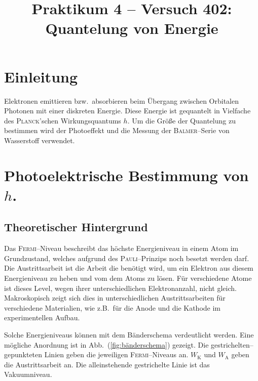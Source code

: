 \documentclass[sn-mathphys-num,iicol]{sn-jnl}
\theoremstyle{thmstyleone}
\theoremstyle{thmstyletwo}
\theoremstyle{thmstylethree}
\begin{document}
        
\title{Praktikum 4 -- Versuch 402: Quantelung von Energie}
\author*[1]{ }
\author*[1]{ }
\maketitle

\newpage
\section{Einleitung}
Elektronen emittieren bzw.\ absorbieren beim Übergang zwischen Orbitalen Photonen mit einer diskreten Energie.
Diese Energie ist gequantelt in Vielfache des \textsc{Planck}'schen Wirkungsquantums $h$.
Um die Größe der Quantelung zu bestimmen wird der Photoeffekt und die Messung der \textsc{Balmer}--Serie von Wasserstoff verwendet.

\section{Photoelektrische Bestimmung von $h$.} \label{sec:photoeffekt}
\subsection{Theoretischer Hintergrund}
Das \textsc{Fermi}--Niveau beschreibt das höchste Energieniveau in einem Atom im Grundzustand, welches aufgrund des \textsc{Pauli}--Prinzips noch besetzt werden darf.
Die Austrittsarbeit ist die Arbeit die benötigt wird, um ein Elektron aus diesem Energieniveau zu heben und vom dem Atoms zu lösen.
Für verschiedene Atome ist dieses Level, wegen ihrer unterschiedlichen Elektronanzahl, nicht gleich.
Makroskopisch zeigt sich dies in unterschiedlichen Austrittsarbeiten für verschiedene Materialien, wie z.B.\ für die Anode und die Kathode im experimentellen Aufbau.

Solche Energieniveaus können mit dem Bänderschema verdeutlicht werden.
Eine mögliche Anordnung ist in Abb.\ (\ref{fig:bänderschema}) gezeigt.
Die gestrichelten--gepunkteten Linien geben die jeweiligen \textsc{Fermi}--Niveaus an.
$W_\text{K}$ und $W_\text{A}$ geben die Austrittsarbeit an.
Die alleinstehende gestrichelte Linie ist das Vakuumniveau.
\end{document}
